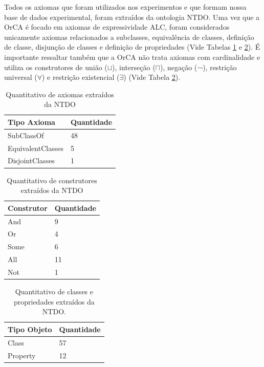 \documentclass{bcc}
\begin{document}
Todos os axiomas que foram utilizados nos experimentos e que formam nossa base de dados experimental, foram extraídos da ontologia NTDO. Uma vez que a OrCA é focado em axiomas de expressividade ALC, foram considerados unicamente axiomas relacionados a subclasses, equivalência de classes, definição de classe, disjunção de classes e definição de propriedades (Vide Tabelas \ref{tab:QtdALSNTDO} e \ref{tab:QtdConstNTDO}). É importante ressaltar também que a OrCA não trata axiomas com cardinalidade e utiliza os construtores de união ($\sqcup$), interseção ($\sqcap$), negação (¬), restrição universal ($\forall$) e restrição existencial ($\exists$) (Vide Tabela \ref{tab:QtdConstNTDO}).

\begin{table}[H]
\centering
\begin{tabular}{l|l}
Tipo Axioma       & Quantidade \\ \hline
SubClassOf        & 48         \\ \hline
EquivalentClasses & 5          \\ \hline
DisjointClasses   & 1          \\
\end{tabular}
\caption{Quantitativo de axiomas extraídos da NTDO}
\label{tab:QtdALSNTDO}
\end{table}

\begin{table}[H]
\centering
\begin{tabular}{l|l}
Construtor & Quantidade \\ \hline
And        & 9          \\ \hline
Or         & 4          \\ \hline
Some       & 6          \\ \hline
All\footnotemark        & 11         \\ \hline
Not        & 1         \\
\end{tabular}
\caption{Quantitativo de construtores extraídos da NTDO}
\label{tab:QtdConstNTDO}
\end{table}


\begin{table}[H]
\centering
\begin{tabular}{l|l}
Tipo Objeto   & Quantidade \\ \hline
Class         & 57         \\ \hline
Property      & 12         \\
\end{tabular}
\caption{Quantitativo de classes e propriedades extraídos da NTDO.}
\label{tab:QtdObjsNTDO}
\end{table}
\end{document}
